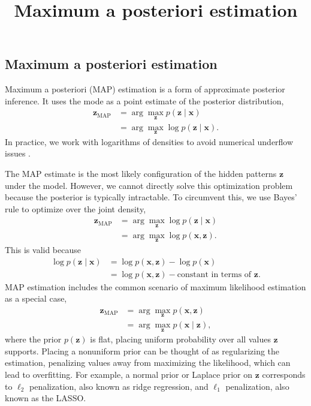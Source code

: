 \title{Maximum a posteriori estimation}

\subsection{Maximum a posteriori estimation}

Maximum a posteriori (MAP) estimation is a form of approximate
posterior inference. It uses the mode as a point estimate of the
posterior distribution,
\begin{align*}
  \mathbf{z}_\text{MAP}
  &=
  \arg \max_\mathbf{z}
  p(\mathbf{z} \mid \mathbf{x})\\
  &=
  \arg \max_\mathbf{z}
  \log p(\mathbf{z} \mid \mathbf{x}).
\end{align*}
In practice, we work with logarithms of densities to avoid numerical underflow
issues \citep{murphy2012machine}.

The MAP estimate is the most likely configuration of the hidden patterns $\mathbf{z}$
under the model. However, we cannot directly solve this optimization problem
because the posterior is typically intractable. To circumvent this, we use Bayes' rule to
optimize over the joint density,
\begin{align*}
  \mathbf{z}_\text{MAP}
  &=
  \arg \max_\mathbf{z}
  \log p(\mathbf{z} \mid \mathbf{x})\\
  &=
  \arg \max_\mathbf{z}
  \log p(\mathbf{x}, \mathbf{z}).
\end{align*}
This is valid because
\begin{align*}
  \log p(\mathbf{z} \mid \mathbf{x})
  &=
  \log p(\mathbf{x}, \mathbf{z}) - \log p(\mathbf{x})\\
  &=
  \log p(\mathbf{x}, \mathbf{z}) - \text{constant in terms of } \mathbf{z}.
\end{align*}
MAP estimation includes the common scenario of maximum
likelihood estimation as a special case,
\begin{align*}
  \mathbf{z}_\text{MAP}
  &=
  \arg \max_\mathbf{z}
  p(\mathbf{x}, \mathbf{z})\\
  &=
  \arg \max_\mathbf{z}
  p(\mathbf{x}\mid \mathbf{z}),
\end{align*}
where the prior $p(\mathbf{z})$ is flat, placing uniform probability over all
values $\mathbf{z}$ supports. Placing a nonuniform prior can be thought of as
regularizing the estimation, penalizing values away from maximizing
the likelihood, which can lead to overfitting. For example, a normal
prior or Laplace prior on $\mathbf{z}$ corresponds to $\ell_2$ penalization, also
known as ridge regression, and $\ell_1$ penalization, also
known as the LASSO.

